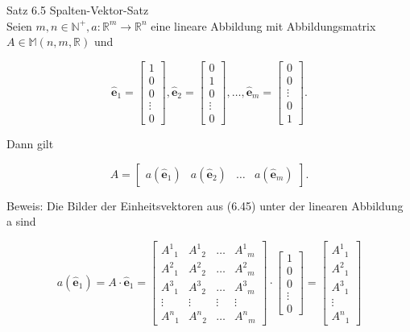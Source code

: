 \documentclass[10pt]{article}
\begin{document}
Satz 6.5 Spalten-Vektor-Satz\\
Seien $m, n \in \mathbb{N}^{+}, a: \mathbb{R}^{m} \rightarrow \mathbb{R}^{n}$ eine lineare Abbildung mit Abbildungsmatrix $A \in \mathbb{M}(n, m, \mathbb{R})$ und

\[
\hat{\mathbf{e}}_{1}=\left[\begin{array}{c}
1  \tag{6.45}\\
0 \\
0 \\
\vdots \\
0
\end{array}\right], \hat{\mathbf{e}}_{2}=\left[\begin{array}{c}
0 \\
1 \\
0 \\
\vdots \\
0
\end{array}\right], \ldots, \hat{\mathbf{e}}_{m}=\left[\begin{array}{c}
0 \\
0 \\
\vdots \\
0 \\
1
\end{array}\right] .
\]

Dann gilt

\[
A=\left[\begin{array}{llll}
a\left(\hat{\mathbf{e}}_{1}\right) & a\left(\hat{\mathbf{e}}_{2}\right) & \ldots & a\left(\hat{\mathbf{e}}_{m}\right) \tag{6.46}
\end{array}\right] .
\]

Beweis: Die Bilder der Einheitsvektoren aus (6.45) unter der linearen Abbildung a sind

\[
a\left(\hat{\mathbf{e}}_{1}\right)=A \cdot \hat{\mathbf{e}}_{1}=\left[\begin{array}{cccc}A^{1}{ }_{1} & A^{1}{ }_{2} & \ldots & A^{1}{ }_{m}  \tag{6.47}\\ A^{2}{ }_{1} & A^{2}{ }_{2} & \ldots & A^{2}{ }_{m} \\ A^{3}{ }_{1} & A^{3}{ }_{2} & \ldots & A^{3}{ }_{m} \\ \vdots & \vdots & \vdots & \vdots \\ A^{n}{ }_{1} & A^{n}{ }_{2} & \ldots & A^{n}{ }_{m}\end{array}\right] \cdot\left[\begin{array}{c}1 \\ 0 \\ 0 \\ \vdots \\ 0\end{array}\right]=\left[\begin{array}{c}A^{1}{ }_{1} \\ A^{2}{ }_{1} \\ A^{3}{ }_{1} \\ \vdots \\ A^{n}{ }_{1}\end{array}\right]
\]
\end{document}

